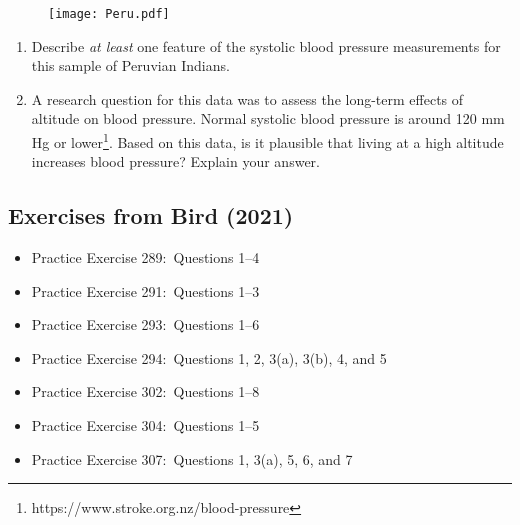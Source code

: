 \documentclass[twoside, 12pt, a4paper]{article}\usepackage[]{graphicx}\usepackage[usenames,dvipsnames]{xcolor}
\begin{document}
\begin{enumerate}[label=\Alph*.]
  \begin{figure}[!h]
    \centering
    \texttt{[image: Peru.pdf]}
  \end{figure}
  
  \begin{enumerate}
    \item Describe \textit{at least} one feature of the systolic blood pressure measurements for this sample of Peruvian Indians.
    \item A research question for this data was to assess the long-term effects of altitude on blood pressure. Normal systolic blood pressure is around 120 mm Hg or lower\footnote{https://www.stroke.org.nz/blood-pressure}. Based on this data, is it plausible that living at a high altitude increases blood pressure? Explain your answer.
  \end{enumerate}
\end{enumerate}

\subsection{Exercises from Bird (2021)}
\medskip

\begin{itemize}
  \item Practice Exercise 289:\ Questions 1--4
  \item Practice Exercise 291:\ Questions 1--3
  \item Practice Exercise 293:\ Questions 1--6
  \item Practice Exercise 294:\ Questions 1, 2, 3(a), 3(b), 4, and 5
  \item Practice Exercise 302:\ Questions 1--8
  \item Practice Exercise 304:\ Questions 1--5
  \item Practice Exercise 307:\ Questions 1, 3(a), 5, 6, and 7
\end{itemize}
\end{document}
